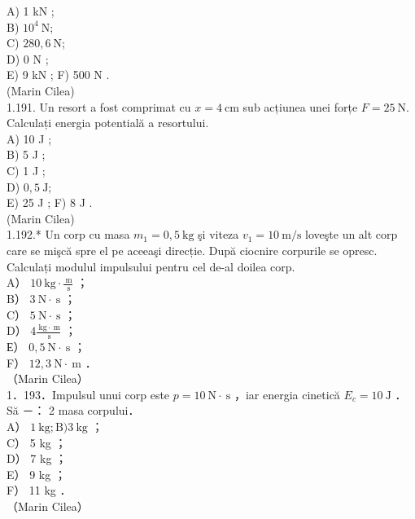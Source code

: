 \documentclass[10pt]{article}
\begin{document}
A) 1 kN ;\\
B) $10^{4} \mathrm{~N}$;\\
C) $280,6 \mathrm{~N}$;\\
D) 0 N ;\\
E) 9 kN ; F) 500 N .\\
(Marin Cilea)\\
1.191. Un resort a fost comprimat cu $x=4 \mathrm{~cm}$ sub acțiunea unei forțe $F=25 \mathrm{~N}$. Calculați energia potentială a resortului.\\
A) 10 J ;\\
B) 5 J ;\\
C) 1 J ;\\
D) $0,5 \mathrm{~J}$;\\
E) 25 J ; F) 8 J .\\
(Marin Cilea)\\
1.192.* Un corp cu masa $m_{1}=0,5 \mathrm{~kg}$ şi viteza $v_{1}=10 \mathrm{~m} / \mathrm{s}$ loveşte un alt corp care se mişcă spre el pe aceeaşi direcție. După ciocnire corpurile se opresc. Calculați modulul impulsului pentru cel de-al doilea corp.\\
A） $10 \mathrm{~kg} \cdot \frac{\mathrm{~m}}{\mathrm{~s}}$ ；\\
B） $3 \mathrm{~N} \cdot \mathrm{~s}$ ；\\
C） $5 \mathrm{~N} \cdot \mathrm{~s}$ ；\\
D） $4 \frac{\mathrm{~kg} \cdot \mathrm{~m}}{\mathrm{~s}}$ ；\\
Е） $0,5 \mathrm{~N} \cdot \mathrm{~s}$ ；\\
F） $12,3 \mathrm{~N} \cdot \mathrm{~m}$ ．\\
（Marin Cilea）\\
1．193．Impulsul unui corp este $p=10 \mathrm{~N} \cdot \mathrm{~s}$ ，iar energia cinetică $E_{c}=10 \mathrm{~J}$ ．Să －： 2 masa corpului．\\
A） $1 \mathrm{~kg} ; \mathrm{B}) 3 \mathrm{~kg}$ ；\\
C） 5 kg ；\\
D） 7 kg ；\\
E） 9 kg ；\\
F） 11 kg ．\\
（Marin Cilea）
\end{document}
